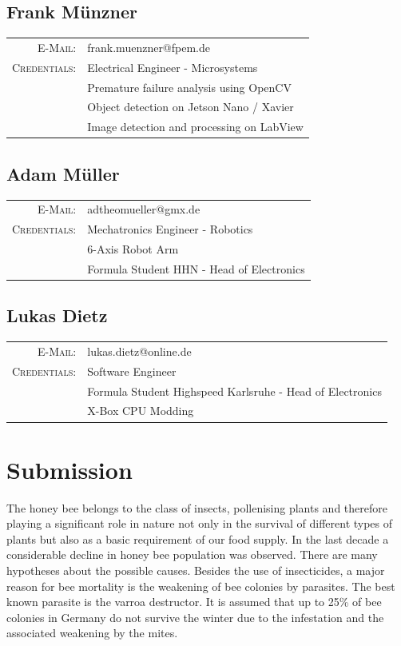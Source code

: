 \documentclass[a4paper,titlepage]{article}
\begin{document}
\subsection*{Frank Münzner}
\begin{tabular}{rl}
\textsc{E-Mail:} & frank.muenzner@fpem.de \\
\textsc{Credentials:} & Electrical Engineer - Microsystems \\
\textsc & Premature failure analysis using OpenCV \\
\textsc & Object detection on Jetson Nano / Xavier \\
\textsc & Image detection and processing on LabView
\end{tabular}

\subsection*{Adam Müller}
\begin{tabular}{rl}
\textsc{E-Mail:} & adtheomueller@gmx.de \\
\textsc{Credentials:} & Mechatronics Engineer - Robotics \\
\textsc & 6-Axis Robot Arm \\
\textsc & Formula Student HHN - Head of Electronics
\end{tabular}

\subsection*{Lukas Dietz}
\begin{tabular}{rl}
\textsc{E-Mail:} & lukas.dietz@online.de \\
\textsc{Credentials:} & Software Engineer \\
\textsc & Formula Student Highspeed Karlsruhe - Head of Electronics \\
\textsc & X-Box CPU Modding
\end{tabular}

\newpage
\section{Submission}

The honey bee belongs to the class of insects, pollenising plants and therefore playing a significant role in nature not only in the survival of different types of plants but also as a basic requirement of our food supply.
In the last decade a considerable decline in honey bee population was observed.
There are many hypotheses about the possible causes.
Besides the use of insecticides, a major reason for bee mortality is the weakening of bee colonies by parasites.
The best known parasite is the varroa destructor.
It is assumed that up to 25\% of bee colonies in Germany do not survive the winter due to the infestation and the associated weakening by the mites. 
\end{document}

